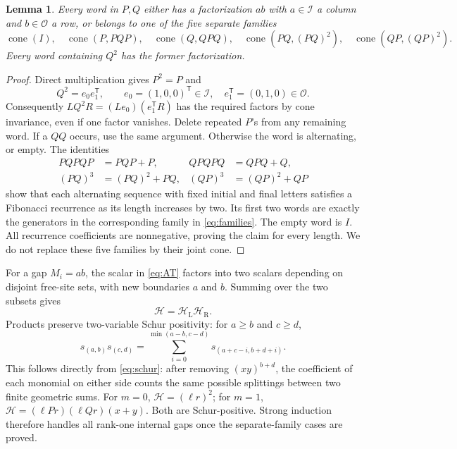 \documentclass[11pt]{article}
\newtheorem{lemma}[theorem]{Lemma}
\newcommand{\cO}{\mathcal O}
\newcommand{\cI}{\mathcal I}
\DeclareMathOperator{\cone}{cone}
\begin{document}
\begin{lemma}\label{lem:gaps}
Every word in $P,Q$ either has a factorization $ab$ with $a\in\cI$
a column and $b\in\cO$ a row, or belongs to one of the five separate families
\begin{equation}\label{eq:families}
 \cone(I),\quad \cone(P,PQP),\quad \cone(Q,QPQ),\quad
 \cone(PQ,(PQ)^2),\quad \cone(QP,(QP)^2).
\end{equation}
Every word containing $Q^2$ has the former factorization.
\end{lemma}
\begin{proof}
Direct multiplication gives $P^2=P$ and
\begin{equation}\label{eq:rankone}
 Q^2=e_0e_1^{\mathsf T},\qquad
 e_0=(1,0,0)^{\mathsf T}\in\cI,\quad
 e_1^{\mathsf T}=(0,1,0)\in\cO.
\end{equation}
Consequently $LQ^2R=(Le_0)(e_1^{\mathsf T}R)$ has the required factors
by cone invariance, even if one factor vanishes.
Delete repeated $P$'s from any remaining word. If a $QQ$ occurs, use
the same argument. Otherwise the word is alternating, or empty.
The identities
\begin{align}
 PQPQP&=PQP+P,& QPQPQ&=QPQ+Q,\label{eq:odd}\\
 (PQ)^3&=(PQ)^2+PQ,& (QP)^3&=(QP)^2+QP\label{eq:even}
\end{align}
show that each alternating sequence with fixed initial and final letters
satisfies a Fibonacci recurrence as its length increases by two.
Its first two words are exactly the generators in the corresponding
family in \eqref{eq:families}. The empty word is $I$.
All recurrence coefficients are nonnegative, proving the claim for
every length. We do not replace these five families by their joint cone.
\end{proof}

For a gap $M_i=ab$, the scalar in \eqref{eq:AT} factors into two scalars
depending on disjoint free-site sets, with new boundaries $a$ and $b$.
Summing over the two subsets gives
\begin{equation}\label{eq:factorH}
 \mathcal H=\mathcal H_{\mathrm L}\mathcal H_{\mathrm R}.
\end{equation}
Products preserve two-variable Schur positivity: for $a\ge b$ and $c\ge d$,
\begin{equation}\label{eq:product}
 s_{(a,b)}s_{(c,d)}=
 \sum_{i=0}^{\min(a-b,c-d)}s_{(a+c-i,b+d+i)}.
\end{equation}
This follows directly from \eqref{eq:schur}: after removing $(xy)^{b+d}$,
the coefficient of each monomial on either side counts the same possible
splittings between two finite geometric sums. For $m=0$, $\mathcal H=(\ell r)^2$;
for $m=1$, $\mathcal H=(\ell Pr)(\ell Qr)(x+y)$. Both are Schur-positive.
Strong induction therefore handles all rank-one internal gaps once the
separate-family cases are proved.
\end{document}
